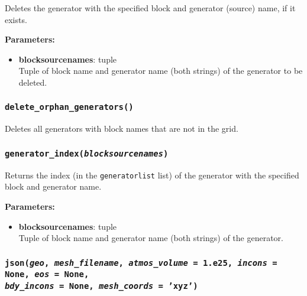 Deletes the generator with the specified block and generator (source) name, if it exists.

\textbf{Parameters:}
\begin{itemize}
\item \textbf{blocksourcenames}: tuple\\
  Tuple of block name and generator name (both strings) of the generator to be deleted.
\end{itemize}

\begin{snugshade}
\subsubsection{\texttt{delete\_orphan\_generators()}}
\end{snugshade}
\label{sec:t2data:delete_orphan_generators}

Deletes all generators with block names that are not in the grid.

\begin{snugshade}
\subsubsection{\texttt{generator\_index(\emph{blocksourcenames})}}
\end{snugshade}
\label{sec:t2data:generator_index}

Returns the index (in the \texttt{generatorlist} list) of the generator with the specified block and generator name.

\textbf{Parameters:}
\begin{itemize}
\item \textbf{blocksourcenames}: tuple\\
  Tuple of block name and generator name (both strings) of the generator.
\end{itemize}

\begin{snugshade}
  \subsubsection{\texttt{json(\emph{geo}, \emph{mesh\_filename}, \emph{atmos\_volume} = 1.e25,
      \emph{incons} = \texttt{None}, \emph{eos} = \texttt{None}, \\
      \emph{bdy\_incons} = \texttt{None}, \emph{mesh\_coords} = 'xyz')}}
\end{snugshade}
\label{sec:t2data:json}

